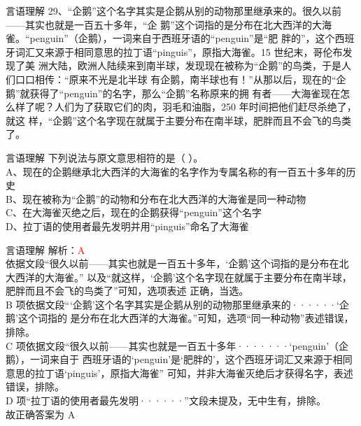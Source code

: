 \documentclass[aspectratio=169]{beamer}
\begin{document}
\begin{frame}[t]{言语理解}
29、“企鹅”这个名字其实是企鹅从别的动物那里继承来的。很久以前——其实也就是一百五十多年，“企
鹅”这个词指的是分布在北大西洋的大海雀。“penguin”（企鹅），一词来自于西班牙语的“penguin”是“肥
胖的”，这个西班牙词汇又来源于相同意思的拉丁语“pinguis”，原指大海雀。15 世纪末，哥伦布发现了美
洲大陆，欧洲人陆续来到南半球，发现现在被称为“企鹅”的鸟类，于是人们口口相传：“原来不光是北半球
有企鹅，南半球也有！”从那以后，现在的“企鹅”就获得了“penguin”的名字，那么“企鹅”名称原来的拥
有者——大海雀现在怎么样了呢？人们为了获取它们的肉，羽毛和油脂，250 年时间把他们赶尽杀绝了，就这
样，“企鹅”这个名字现在就属于主要分布在南半球，肥胖而且不会飞的鸟类了。\\
\end{frame}


\begin{frame}[t]{言语理解}
下列说法与原文意思相符的是（ ）。\\
A、现在的企鹅继承北大西洋的大海雀的名字作为专属名称的有一百五十多年的历史\\
B、现在被称为“企鹅”的动物和分布在北大西洋的大海雀是同一种动物\\
C、在大海雀灭绝之后，现在的企鹅获得“penguin”这个名字\\
D、拉丁语的使用者最先发明并用“pinguis”命名了大海雀\\
\end{frame}

\begin{frame}[t]{言语理解}
    解析：\textcolor{red}{A}\\
    依据文段“很久以前——其实也就是一百五十多年，‘企鹅’这个词指的是分布在北大西洋的大海雀。”
以及“就这样，‘企鹅’这个名字现在就属于主要分布在南半球，肥胖而且不会飞的鸟类了”可知，选项表述
正确，当选。\\
B 项依据文段“‘企鹅’这个名字其实是企鹅从别的动物那里继承来的······‘企鹅’这个词指的
是分布在北大西洋的大海雀。”可知，选项“同一种动物”表述错误，排除。\\
C 项依据文段“很久以前——其实也就是一百五十多年·······‘penguin’（企鹅），一词来自于
西班牙语的‘penguin’是‘肥胖的’，这个西班牙词汇又来源于相同意思的拉丁语‘pinguis’，原指大海雀”
可知，并非大海雀灭绝后才获得名字，表述错误，排除。\\
D 项“拉丁语的使用者最先发明······”文段未提及，无中生有，排除。\\
故正确答案为 A\\
\end{frame}
\end{document}
